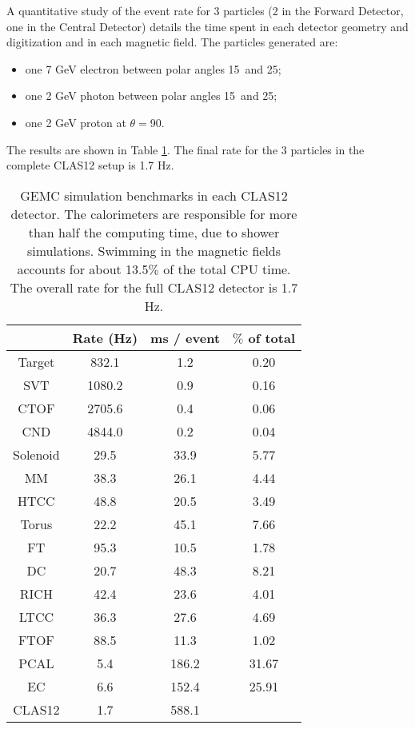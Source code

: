 A quantitative study of the event rate for 3 particles (2 in the Forward Detector, one in the Central Detector)
details the time spent in each detector geometry and digitization and in each magnetic field.
The particles generated are:

\begin{itemize}
	\item one 7 GeV electron between polar angles 15\mdeg \ and 25\mdeg;
	\item one 2 GeV photon between polar angles 15\mdeg \ and 25\mdeg;
	\item one 2 GeV proton at $\theta=$90\mdeg.
\end{itemize}

The results are shown in Table \ref{tab:benchmarks}. The final rate for the 3 particles in the
complete CLAS12 setup is 1.7 Hz.

\begin{table}[h]
	\begin{center}
		\begin{tabular}{ c | c | c | c }
			 \hline \hline
			 & Rate (Hz) &  ms / event &  $\%$ of total\\
			\hline
Target   &  832.1  &   1.2   & 0.20  \\
SVT      &  1080.2 &   0.9   & 0.16  \\
CTOF     &  2705.6 &   0.4   & 0.06  \\
CND      &  4844.0 &   0.2   & 0.04  \\
Solenoid &  29.5   &   33.9  & 5.77  \\
MM       &  38.3   &   26.1  & 4.44  \\
HTCC     &  48.8   &   20.5  & 3.49  \\
Torus    &  22.2   &   45.1  & 7.66  \\
FT       &  95.3   &   10.5  & 1.78  \\
DC       &  20.7   &   48.3  & 8.21  \\
RICH     &  42.4   &   23.6  & 4.01  \\
LTCC     &  36.3   &   27.6  & 4.69  \\
FTOF     &  88.5   &   11.3  & 1.02  \\
PCAL     &  5.4    &   186.2 & 31.67 \\
EC       &  6.6    &   152.4 & 25.91 \\
		\hline
CLAS12   &  1.7    &   588.1 &  \\
		\hline \hline
		\end{tabular}
	\end{center}
	\caption{GEMC simulation benchmarks in each CLAS12 detector. The calorimeters are responsible for more than
             half the computing time, due to shower simulations. Swimming in the magnetic fields accounts for about 13.5$\%$ of the total CPU time.
			 The overall rate for the full CLAS12 detector is 1.7 Hz.
}
\label{tab:benchmarks}
\end{table}

